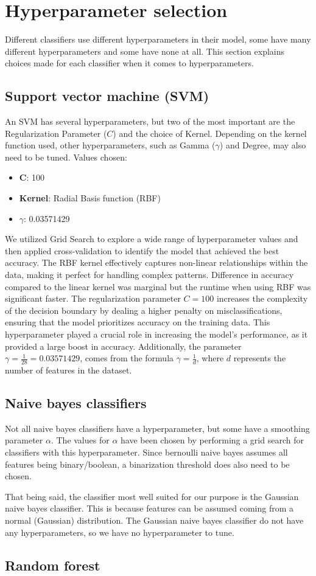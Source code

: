 \section{Hyperparameter selection}
Different classifiers use different hyperparameters in their model, some have many different hyperparameters and some have none at all. 
This section explains choices made for each classifier when it comes to hyperparameters.

\subsection{Support vector machine (SVM)}

An SVM has several hyperparameters, but two of the most important are the Regularization Parameter 
(\(C\)) and the choice of Kernel. Depending on the kernel function used, other hyperparameters, such as Gamma 
(\(\gamma\)) and Degree, may also need to be tuned. Values chosen:

\begin{itemize}
    \item \textbf{\(\boldsymbol{C}\)}: 100
    \item \textbf{Kernel}: Radial Basis function (RBF)
    \item \textbf{\(\gamma\)}: 0.03571429
\end{itemize}
We utilized Grid Search to explore a wide range of hyperparameter values and then applied cross-validation to identify the model that achieved the best accuracy. 
The RBF kernel effectively captures non-linear relationships within the data, making it perfect for handling complex patterns. Difference in accuracy compared to the linear kernel was marginal but the runtime when using RBF was significant faster.
The regularization parameter \(C = 100\) increases the complexity of the decision boundary by dealing a higher penalty on misclassifications, ensuring that the model prioritizes accuracy on the training data. This hyperparameter played a crucial role in increasing the model's performance, as it provided a large boost in accuracy. 
Additionally, the parameter \(\gamma = \frac{1}{28} = 0.03571429\), comes from the formula \(\gamma = \frac{1}{d}\), where \(d\) represents the number of features in the dataset.

\subsection{Naive bayes classifiers}
Not all naive bayes classifiers have a hyperparameter, but some have a smoothing parameter $\alpha$. The values for $\alpha$ have been chosen by performing a grid search for classifiers with this hyperparameter. Since bernoulli naive bayes assumes all features being binary/boolean, a binarization threshold does also need to be chosen. 
\par
That being said, the classifier most well suited for our purpose is the Gaussian naive bayes classifier. This is because features can be assumed coming from a normal (Gaussian) distribution. The Gaussian naive bayes classifier do not have any hyperparameters, so we have no hyperparameter to tune. 

\subsection{Random forest}